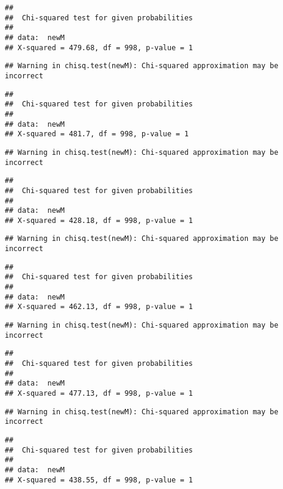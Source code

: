 \documentclass[]{article}
\begin{document}
\begin{verbatim}
## 
##  Chi-squared test for given probabilities
## 
## data:  newM
## X-squared = 479.68, df = 998, p-value = 1
\end{verbatim}

\begin{verbatim}
## Warning in chisq.test(newM): Chi-squared approximation may be incorrect
\end{verbatim}

\begin{verbatim}
## 
##  Chi-squared test for given probabilities
## 
## data:  newM
## X-squared = 481.7, df = 998, p-value = 1
\end{verbatim}

\begin{verbatim}
## Warning in chisq.test(newM): Chi-squared approximation may be incorrect
\end{verbatim}

\begin{verbatim}
## 
##  Chi-squared test for given probabilities
## 
## data:  newM
## X-squared = 428.18, df = 998, p-value = 1
\end{verbatim}

\begin{verbatim}
## Warning in chisq.test(newM): Chi-squared approximation may be incorrect
\end{verbatim}

\begin{verbatim}
## 
##  Chi-squared test for given probabilities
## 
## data:  newM
## X-squared = 462.13, df = 998, p-value = 1
\end{verbatim}

\begin{verbatim}
## Warning in chisq.test(newM): Chi-squared approximation may be incorrect
\end{verbatim}

\begin{verbatim}
## 
##  Chi-squared test for given probabilities
## 
## data:  newM
## X-squared = 477.13, df = 998, p-value = 1
\end{verbatim}

\begin{verbatim}
## Warning in chisq.test(newM): Chi-squared approximation may be incorrect
\end{verbatim}

\begin{verbatim}
## 
##  Chi-squared test for given probabilities
## 
## data:  newM
## X-squared = 438.55, df = 998, p-value = 1
\end{verbatim}
\end{document}

